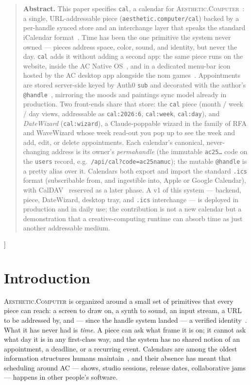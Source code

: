 \documentclass[10pt,letterpaper,twocolumn]{article}
\newcommand{\ac}{\textsc{Aesthetic.Computer}}
\begin{document}
{\begin{quote}
\small\noindent\textbf{Abstract.}
This paper specifies \texttt{cal}, a calendar for \ac{}~\citep{scudder2026ac}: a single, URL-addressable piece (\texttt{aesthetic.computer/cal}) backed by a per-handle synced store and an interchange layer that speaks the standard iCalendar format~\citep{rfc5545}. Time has been the one primitive the system never owned --- pieces address space, color, sound, and identity, but never the day. \texttt{cal} adds it without adding a second app: the same piece runs on the website, inside the AC Native OS~\citep{scudder2026nativeos}, and in a dedicated menu-bar icon hosted by the AC desktop app alongside the nom games~\citep{scudder2026nom}. Appointments are stored server-side keyed by Auth0 \texttt{sub} and decorated with the author's \texttt{@handle}~\citep{scudder2026identity}, mirroring the moods and paintings sync model already in production. Two front-ends share that store: the \texttt{cal} piece (month / week / day views, addressable as \texttt{cal:2026:6}, \texttt{cal:week}, \texttt{cal:day}), and \emph{DateWizard} (\texttt{cal:wizard}), a Claude-poppable wizard in the family of RFA and WaveWizard whose week read-out you pop up to see the week and add, edit, or delete appointments. Each calendar's canonical, never-changing address is its owner's \emph{permahandle} (the immutable \texttt{ac25\dots} code on the \texttt{users} record, e.g.\ \texttt{/api/cal?code=ac25namuc}); the mutable \texttt{@handle} is a pretty alias over it. Calendars both export and import the standard \texttt{.ics} format (subscribable from, and ingestible into, Apple or Google Calendar), with CalDAV~\citep{rfc4791} reserved as a later phase. A v1 of this system --- backend, piece, DateWizard, desktop tray, and \texttt{.ics} interchange --- is deployed in production and in daily use; the contribution is not a new calendar but a demonstration that a creative-computing runtime can absorb time as just another addressable medium.
\end{quote}
\vspace{0.5em}
}]

\section{Introduction}

\ac{} is organized around a small set of primitives that every piece can reach: a screen to draw on, a synth to sound, an input stream, a URL to be addressed by, and --- since the handle system landed --- a verified identity~\citep{scudder2026identity}. What it has never had is \emph{time}. A piece can ask what frame it is on; it cannot ask what day it is in any first-class way, and the system has no shared notion of an appointment, a deadline, or a recurring event. Calendars are among the oldest information structures humans maintain~\citep{zerubavel1985seven}, and their absence has meant that scheduling around AC --- shows, studio sessions, release dates, collaborative jams --- happens in other people's software.
\end{document}
